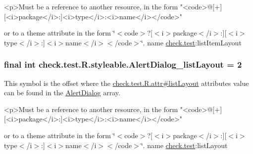 \begin{DoxyVerb}      <p>Must be a reference to another resource, in the form "<code>@[+][<i>package</i>:]<i>type</i>:<i>name</i></code>"
\end{DoxyVerb}
 or to a theme attribute in the form \char`\"{}$<$code$>$?\mbox{[}$<$i$>$package$<$/i$>$\+:\mbox{]}\mbox{[}$<$i$>$type$<$/i$>$\+:\mbox{]}$<$i$>$name$<$/i$>$$<$/code$>$\char`\"{}.  name \hyperlink{namespacecheck_1_1test}{check.\+test}\+:list\+Item\+Layout \hypertarget{classcheck_1_1test_1_1_r_1_1styleable_ae130e7610181925120d23e9b40d846c5}{}
\subsubsection[{Alert\+Dialog\+\_\+list\+Layout}]{\setlength{\rightskip}{0pt plus 5cm}final int check.\+test.\+R.\+styleable.\+Alert\+Dialog\+\_\+list\+Layout = 2\hspace{0.3cm}{\ttfamily [static]}}\label{classcheck_1_1test_1_1_r_1_1styleable_ae130e7610181925120d23e9b40d846c5}
This symbol is the offset where the \hyperlink{classcheck_1_1test_1_1_r_1_1attr_a73e1a0b98c2b12f1eb61b082e6a2c468}{check.\+test.\+R.\+attr\#list\+Layout} attribute\textquotesingle{}s value can be found in the \hyperlink{classcheck_1_1test_1_1_r_1_1styleable_a1d9c160813dfdd546911e783935ebb65}{Alert\+Dialog} array.

\begin{DoxyVerb}      <p>Must be a reference to another resource, in the form "<code>@[+][<i>package</i>:]<i>type</i>:<i>name</i></code>"
\end{DoxyVerb}
 or to a theme attribute in the form \char`\"{}$<$code$>$?\mbox{[}$<$i$>$package$<$/i$>$\+:\mbox{]}\mbox{[}$<$i$>$type$<$/i$>$\+:\mbox{]}$<$i$>$name$<$/i$>$$<$/code$>$\char`\"{}.  name \hyperlink{namespacecheck_1_1test}{check.\+test}\+:list\+Layout \hypertarget{classcheck_1_1test_1_1_r_1_1styleable_ae3a136130119ae9ebf31f7eb82968d0d}{}
